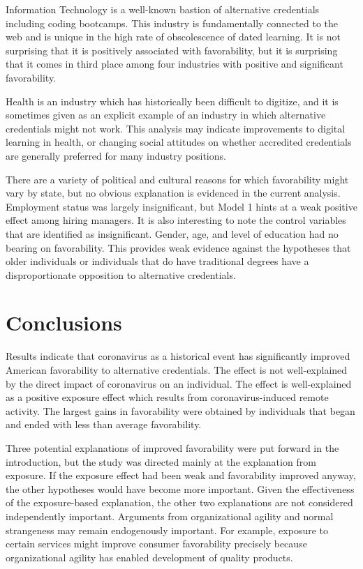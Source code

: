 \documentclass[review]{elsarticle}
\begin{document}
Information Technology is a well-known bastion of alternative credentials including coding bootcamps.
This industry is fundamentally connected to the web and is unique in the high rate of obscolescence of dated learning.
It is not surprising that it is positively associated with favorability,
but it is surprising that it comes in third place among four industries with positive and significant favorability.

Health is an industry which has historically been difficult to digitize,
and it is sometimes given as an explicit example of an industry in which alternative credentials
might not work. %
This analysis may indicate improvements to digital learning in health,
or changing social attitudes on whether accredited credentials are
generally preferred for many industry positions.

There are a variety of political and cultural reasons for which favorability might vary by state,
but no obvious explanation is evidenced in the current analysis.
Employment status was largely insignificant,
but Model 1 hints at a weak positive effect among hiring managers.
It is also interesting to note the control variables that are identified as insignificant.
Gender, age, and level of education had no bearing on favorability.
This provides weak evidence against the hypotheses that older individuals
or individuals that do have traditional degrees have a disproportionate opposition to alternative credentials.

\section{Conclusions}

Results indicate that coronavirus as a historical event has significantly improved American favorability to alternative credentials.
The effect is not well-explained by the direct impact of coronavirus on an individual.
The effect is well-explained as a positive exposure effect which results from coronavirus-induced remote activity.
The largest gains in favorability were obtained by individuals that began and ended with less than average favorability.

Three potential explanations of improved favorability were put forward in the introduction,
but the study was directed mainly at the explanation from exposure.
If the exposure effect had been weak and favorability improved anyway, the other hypotheses would have become more important.
Given the effectiveness of the exposure-based explanation, the other two explanations are not considered independently important.
Arguments from organizational agility and normal strangeness may remain endogenously important.
For example, exposure to certain services might improve consumer favorability precisely because
organizational agility has enabled development of quality products.
\end{document}
